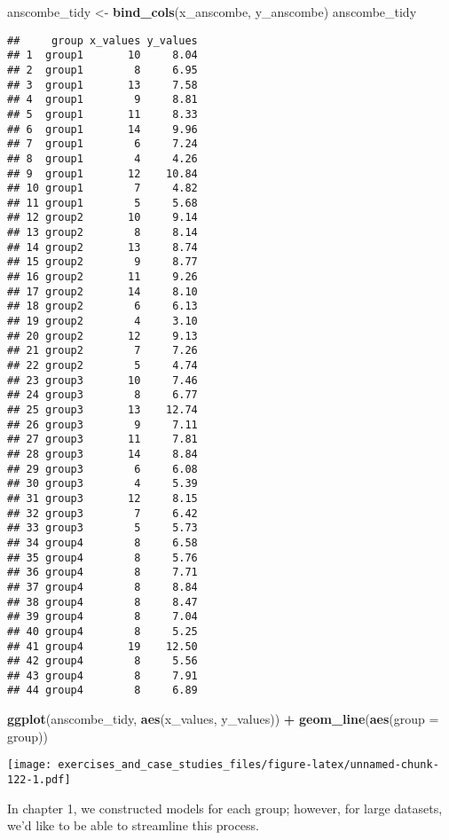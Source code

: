 \documentclass[]{book}
\newenvironment{Shaded}{\begin{snugshade}}{\end{snugshade}}
\newcommand{\DataTypeTok}[1]{\textcolor[rgb]{0.13,0.29,0.53}{#1}}
\newcommand{\KeywordTok}[1]{\textcolor[rgb]{0.13,0.29,0.53}{\textbf{#1}}}
\newcommand{\NormalTok}[1]{#1}
\newcommand{\OperatorTok}[1]{\textcolor[rgb]{0.81,0.36,0.00}{\textbf{#1}}}
\newcommand{\StringTok}[1]{\textcolor[rgb]{0.31,0.60,0.02}{#1}}
\theoremstyle{definition}
\theoremstyle{definition}
\theoremstyle{definition}
\theoremstyle{remark}
\begin{document}
\begin{Shaded}
\begin{Highlighting}[]
\NormalTok{anscombe_tidy <-}\StringTok{ }\KeywordTok{bind_cols}\NormalTok{(x_anscombe, y_anscombe)}
\NormalTok{anscombe_tidy}
\end{Highlighting}
\end{Shaded}

\begin{verbatim}
##     group x_values y_values
## 1  group1       10     8.04
## 2  group1        8     6.95
## 3  group1       13     7.58
## 4  group1        9     8.81
## 5  group1       11     8.33
## 6  group1       14     9.96
## 7  group1        6     7.24
## 8  group1        4     4.26
## 9  group1       12    10.84
## 10 group1        7     4.82
## 11 group1        5     5.68
## 12 group2       10     9.14
## 13 group2        8     8.14
## 14 group2       13     8.74
## 15 group2        9     8.77
## 16 group2       11     9.26
## 17 group2       14     8.10
## 18 group2        6     6.13
## 19 group2        4     3.10
## 20 group2       12     9.13
## 21 group2        7     7.26
## 22 group2        5     4.74
## 23 group3       10     7.46
## 24 group3        8     6.77
## 25 group3       13    12.74
## 26 group3        9     7.11
## 27 group3       11     7.81
## 28 group3       14     8.84
## 29 group3        6     6.08
## 30 group3        4     5.39
## 31 group3       12     8.15
## 32 group3        7     6.42
## 33 group3        5     5.73
## 34 group4        8     6.58
## 35 group4        8     5.76
## 36 group4        8     7.71
## 37 group4        8     8.84
## 38 group4        8     8.47
## 39 group4        8     7.04
## 40 group4        8     5.25
## 41 group4       19    12.50
## 42 group4        8     5.56
## 43 group4        8     7.91
## 44 group4        8     6.89
\end{verbatim}

\begin{Shaded}
\begin{Highlighting}[]
\KeywordTok{ggplot}\NormalTok{(anscombe_tidy, }\KeywordTok{aes}\NormalTok{(x_values, y_values)) }\OperatorTok{+}
\StringTok{  }\KeywordTok{geom_line}\NormalTok{(}\KeywordTok{aes}\NormalTok{(}\DataTypeTok{group =}\NormalTok{ group))}
\end{Highlighting}
\end{Shaded}

\texttt{[image: exercises\_and\_case\_studies\_files/figure-latex/unnamed-chunk-122-1.pdf]}

In chapter 1, we constructed models for each group; however, for large
datasets, we'd like to be able to streamline this process.
\end{document}
